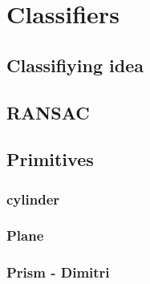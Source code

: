\documentclass[../ClassicThesis.tex]{subfiles}
\begin{document}
\chapter{Classifiers}\label{ch:classifiers}

\section{Classifiying idea}
\section{RANSAC}
\section{Primitives}
\subsection{cylinder}
\subsection{Plane}
\subsection{Prism - Dimitri}
\end{document}
